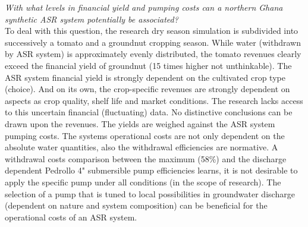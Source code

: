 \textit{With what levels in financial yield and pumping costs can a northern Ghana synthetic ASR system potentially be associated?}
\smallskip \\
To deal with this question, the research dry season simulation is subdivided into successively a tomato and a groundnut cropping season. While water (withdrawn by ASR system) is approximately evenly distributed, the tomato revenues clearly exceed the financial yield of groundnut (15 times higher not unthinkable). The ASR system financial yield is strongly dependent on the cultivated crop type (choice). And on its own, the crop-specific revenues are strongly dependent on aspects as crop quality, shelf life and market conditions. The research lacks access to this uncertain financial (fluctuating) data. No distinctive conclusions can be drawn upon the revenues. The yields are weighed against the ASR system pumping costs. The systems operational costs are not only dependent on the absolute water quantities, also the withdrawal efficiencies are normative. A withdrawal costs comparison between the maximum (58\%) and the discharge dependent Pedrollo 4" submersible pump efficiencies learns, it is not desirable to apply the specific pump under all conditions (in the scope of research). The selection of a pump that is tuned to local possibilities in groundwater discharge (dependent on nature and system composition) can be beneficial for the operational costs of an ASR system. \\

%


%

